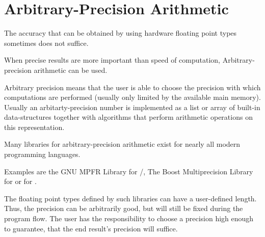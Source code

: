 \section{Arbitrary-Precision Arithmetic}
	The accuracy that can be obtained by using hardware floating point types
  sometimes does not suffice.
	
	When precise results are more important than speed of computation, Arbitrary-precision arithmetic can be used.

	Arbitrary precision means that the user is able to choose the precision with which 
	computations are performed (usually only limited by the available main memory).
  Usually an arbitarty-precision number is implemented as a list or array of
  built-in data-structures together with algorithms that perform arithmetic operations on
  this representation.

	Many libraries for arbitrary-precision arithmetic exist for nearly all modern
  programming languages.
  
	Examples are the GNU MPFR Library for /\cc \cite{mpfr}, The Boost Multiprecision
Library for \cc \cite{boostmultiprecision} or  for 
\cite{mpmath}. 
  
  The floating point types defined by such libraries can have a user-defined
  length. 
  Thus, the precision can be arbitrarily good, but will still be fixed during
  the program flow.
  The user has the responsibility to choose a precision high enough to
  guarantee, that the end result's precision will suffice.

